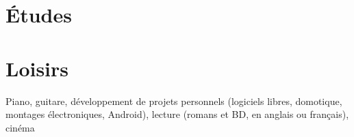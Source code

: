 \documentclass[a4paper]{twentysecondcv} %
\begin{document}
\section{Études}

\begin{twenty} %
\end{twenty}


\section{Loisirs}


Piano, guitare, développement de projets personnels (logiciels libres, domotique, montages électroniques, Android), lecture (romans et BD, en anglais ou français), cinéma






\end{document}
